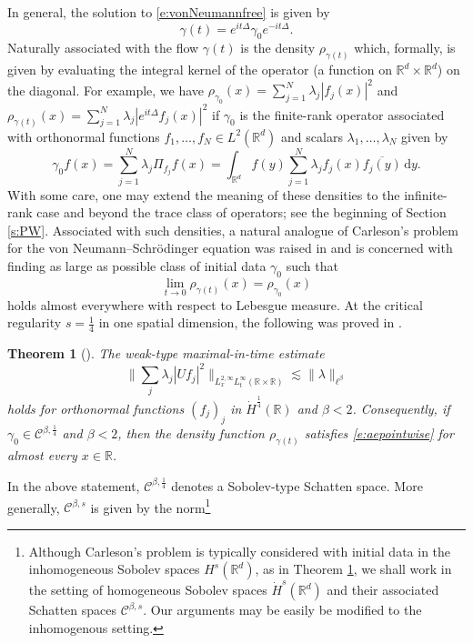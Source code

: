 \documentclass[a4paper]{amsart}
\numberwithin{equation}{section}%
\theoremstyle{plain}%
\newtheorem{theorem}{Theorem}[section]
\theoremstyle{definition}
\theoremstyle{remark}%
\def\C{\mathcal{C}}
\def\C{\mathcal{C}}
\begin{document}
In general, the solution to \eqref{e:vonNeumannfree} is given by
\[
\gamma(t) = e^{it\Delta} \gamma_0 e^{-it\Delta}.
\]
Naturally associated with the flow $\gamma(t)$ is the density $\rho_{\gamma(t)}$ which, formally, is given by evaluating the integral kernel of the operator (a function on $\mathbb{R}^d \times \mathbb{R}^d$) on the diagonal. For example, we have $
\rho_{\gamma_0}(x) = \sum_{j = 1}^N \lambda_j |f_j(x)|^2
$
and
$
\rho_{\gamma(t)}(x) = \sum_{j = 1}^N \lambda_j |e^{it\Delta}f_j(x)|^2
$
if $\gamma_0$ is the finite-rank operator associated with orthonormal functions $f_1,\ldots,f_N \in L^2(\mathbb{R}^d)$ and scalars $\lambda_1,\ldots,\lambda_N$ given by
\[
\gamma_0f(x) = \sum_{j = 1}^N \lambda_j \Pi_{f_j}f(x) = \int_{\mathbb{R}^d} f(y) \sum_{j = 1}^N \lambda_j f_j(x) \overline{f_j(y)} \, \mathrm{d}y.
\]
With some care, one may extend the meaning of these densities to the infinite-rank case and beyond the trace class of operators; see 
the beginning of Section \ref{s:PW}. Associated with such densities, a natural analogue of Carleson's problem for the von Neumann--Schr\"odinger equation was raised in \cite{BLN_Selecta} and is concerned with finding as large as possible class of initial data $\gamma_0$ such that
\begin{equation} \label{e:aepointwise}
\lim_{t \to 0} \rho_{\gamma(t)}(x) = \rho_{\gamma_0}(x)
\end{equation}
holds almost everywhere with respect to Lebesgue measure. At the critical regularity $s = \frac{1}{4}$ in one spatial dimension, the following was proved in \cite{BLN_Selecta}.
\begin{theorem}[\cite{BLN_Selecta}] \label{t:pointwiseBLN}
The weak-type maximal-in-time estimate
\begin{equation} \label{e:ONmaximalweak}
\bigg\| \sum_j \lambda_j |Uf_j|^2 \bigg\|_{L^{2,\infty}_xL^\infty_t(\mathbb{R} \times \mathbb{R})} \lesssim \| \lambda \|_{\ell^\beta}
\end{equation}
holds for orthonormal functions $(f_j)_j$ in $\dot{H}^{\frac{1}{4}}(\mathbb{R})$ and $\beta < 2$. Consequently, if $\gamma_0 \in  \mathcal{C}^{\beta,\frac{1}{4}}$ and $\beta < 2$, then the density function $\rho_{\gamma(t)}$ satisfies \eqref{e:aepointwise} for almost every $x \in \mathbb{R}$.
\end{theorem} 
In the above statement, $\mathcal{C}^{\beta,\frac{1}{4}}$ denotes a Sobolev-type Schatten space. More generally, $\C^{\beta,s}$ is given by the norm\footnote{Although Carleson's problem is typically considered with initial data in the inhomogeneous Sobolev spaces $H^s(\mathbb{R}^d)$, as in Theorem \ref{t:pointwiseBLN}, we shall work in the setting of homogeneous Sobolev spaces $\dot{H}^s(\mathbb{R}^d)$ and their associated Schatten spaces $\C^{\beta,s}$. Our arguments may be easily be modified to the inhomogenous setting.}
\end{document}
